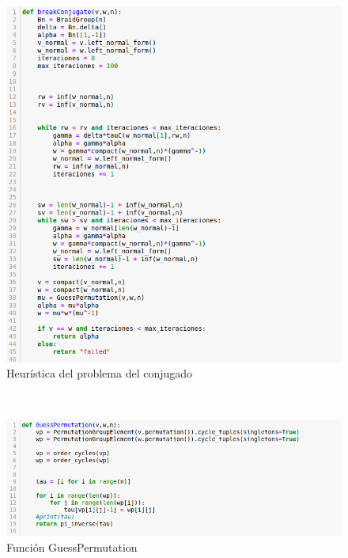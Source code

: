 \documentclass[12pt]{article}
\theoremstyle{definition}
\begin{document}
\begin{figure}[h!]
\centering
\includegraphics[scale=0.5]{imgs/breakConjugate.png} 
\caption{Heurística del problema del conjugado}
\label{img:alg_a}
\end{figure}
\ 
\newline
\newline
\begin{figure}[h!]
\centering
\includegraphics[scale=0.5]{imgs/GuessPermutation.png} 
\caption{Función GuessPermutation}
\label{img:guess_per}
\end{figure}

\ 
\newpage
\ 
\newpage
\ 
\newpage
\end{document}
